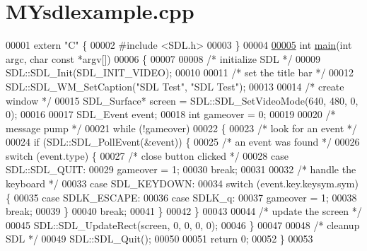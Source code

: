 \hypertarget{MYsdlexample_8cpp_source}{\section{M\-Ysdlexample.\-cpp}
}

\begin{DoxyCode}
00001 \textcolor{keyword}{extern} \textcolor{stringliteral}{"C"} \{
00002 \textcolor{preprocessor}{#include <SDL.h>}
00003 \}
00004 
\hypertarget{MYsdlexample_8cpp_source_l00005}{}\hyperlink{MYsdlexample_8cpp_abf9e6b7e6f15df4b525a2e7705ba3089}{00005} \textcolor{keywordtype}{int} \hyperlink{MYexample_8cpp_ae66f6b31b5ad750f1fe042a706a4e3d4}{main}(\textcolor{keywordtype}{int} argc, \textcolor{keywordtype}{char} \textcolor{keyword}{const} *argv[])
00006 \{
00007 
00008   \textcolor{comment}{/* initialize SDL */}
00009   SDL::SDL\_Init(SDL\_INIT\_VIDEO);
00010 
00011   \textcolor{comment}{/* set the title bar */}
00012   SDL::SDL\_WM\_SetCaption(\textcolor{stringliteral}{"SDL Test"}, \textcolor{stringliteral}{"SDL Test"});
00013 
00014   \textcolor{comment}{/* create window */}
00015   SDL\_Surface* screen = SDL::SDL\_SetVideoMode(640, 480, 0, 0);
00016 
00017   SDL\_Event event;
00018   \textcolor{keywordtype}{int} gameover = 0;
00019 
00020   \textcolor{comment}{/* message pump */}
00021   \textcolor{keywordflow}{while} (!gameover)
00022   \{
00023     \textcolor{comment}{/* look for an event */}
00024     \textcolor{keywordflow}{if} (SDL::SDL\_PollEvent(&event)) \{
00025       \textcolor{comment}{/* an event was found */}
00026       \textcolor{keywordflow}{switch} (event.type) \{
00027         \textcolor{comment}{/* close button clicked */}
00028       \textcolor{keywordflow}{case} SDL::SDL\_QUIT:
00029           gameover = 1;
00030           \textcolor{keywordflow}{break};
00031 
00032         \textcolor{comment}{/* handle the keyboard */}
00033         \textcolor{keywordflow}{case} SDL\_KEYDOWN:
00034           \textcolor{keywordflow}{switch} (event.key.keysym.sym) \{
00035             \textcolor{keywordflow}{case} SDLK\_ESCAPE:
00036             \textcolor{keywordflow}{case} SDLK\_q:
00037               gameover = 1;
00038               \textcolor{keywordflow}{break};
00039           \}
00040           \textcolor{keywordflow}{break};
00041       \}
00042     \}
00043 
00044     \textcolor{comment}{/* update the screen */}
00045     SDL::SDL\_UpdateRect(screen, 0, 0, 0, 0);
00046   \}
00047 
00048   \textcolor{comment}{/* cleanup SDL */}
00049   SDL::SDL\_Quit();
00050 
00051   \textcolor{keywordflow}{return} 0;
00052 \}
00053 
\end{DoxyCode}
